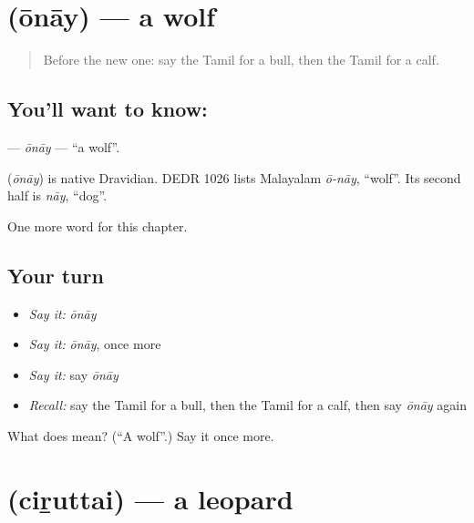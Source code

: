 \section[\texorpdfstring{\ta{ஓநாய்} (ōnāy)}{ஓநாய் (ōnāy)}]{ (ōnāy) — a wolf}

\label{lesson:TA-C187-onay}



\begin{quote}
Before the new one: say the Tamil for a bull, then the Tamil for a calf.
\end{quote}

\subsection*{You'll want to know: }
\textbf{} — \emph{ōnāy} — \textquotedblleft{}a wolf\textquotedblright{}.

\begin{cousinweb}
\textbf{} (\emph{ōnāy}) is native Dravidian. DEDR 1026 lists Malayalam \emph{ō-nāy}, \textquotedblleft{}wolf\textquotedblright{}. Its second half is \emph{nāy}, \textquotedblleft{}dog\textquotedblright{}.
\end{cousinweb}

\begin{grammarlens}[title={What you've built}]
One more word for this chapter.
\end{grammarlens}

\subsection*{Your turn}
\begin{itemize}
\raggedright
  \item \emph{Say it:} \emph{ōnāy}
  \item \emph{Say it:} \emph{ōnāy}, once more
  \item \emph{Say it:} say \emph{ōnāy}
  \item \emph{Recall:} say the Tamil for a bull, then the Tamil for a calf, then say \emph{ōnāy} again
\end{itemize}

\begin{tcolorbox}[breakable,colback=teal!4,colframe=teal!35!black,title={Before you move on}]
What does  mean? (\textquotedblleft{}A wolf\textquotedblright{}.) Say it once more.
\end{tcolorbox}
\section[\texorpdfstring{\ta{சிறுத்தை} (ciṟuttai)}{சிறுத்தை (ciṟuttai)}]{ (ciṟuttai) — a leopard}

